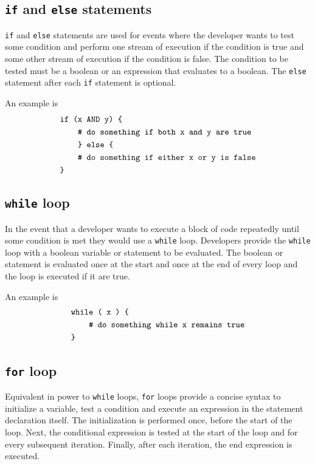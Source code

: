 \documentclass{article}
\newcommand{\code}{\texttt}
\begin{document}
\subsection{\code{if} and \code{else} statements}
\code{if} and \code{else} statements are used for events where the developer wants to test some condition and perform one stream of execution if the condition is true and some other stream of execution if the condition is false. The condition to be tested must be a boolean or an expression that evaluates to a boolean. The \code{else} statement after each \code{if} statement is optional.

An example is
\begin{align*}
&\code{if (x AND y) \{}                                  \\
&\code{\qquad \# do something if both x and y are true}  \\
&\code{\qquad \} else \{}                                \\
&\code{\qquad \# do something if either x or y is false} \\
&\code{\}}
\end{align*}

\subsection{\code{while} loop}
In the event that a developer wants to execute a block of code repeatedly until some condition is met they would use a \code{while} loop. Developers provide the \code{while} loop with a boolean variable or statement to be evaluated. The boolean or statement is evaluated once at the start and once at the end of every loop and the loop is executed if it are true.

An example is
\begin{align*}
&\code{while ( x ) \{}                              \\
&\code{\qquad \# do something while x remains true} \\
&\code{\}}
\end{align*}

\subsection{\code{for} loop}
Equivalent in power to \code{while} loops, \code{for} loops provide a concise syntax to initialize a variable, test a condition and execute an expression in the statement declaration itself. The initialization is performed once, before the start of the loop. Next, the conditional expression is tested at the start of the loop and for every subsequent iteration. Finally, after each iteration, the end expression is executed. 
\end{document}

